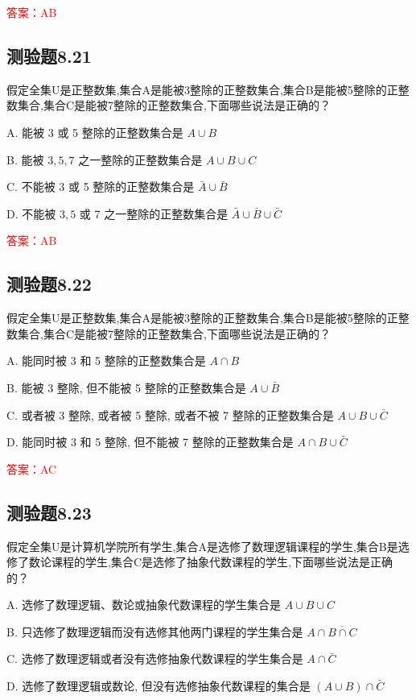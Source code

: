 \documentclass[UTF8, heading=true]{ctexart}
\begin{document}
\textcolor{red}{答案：AB}

\subsection{测验题8.21}

假定全集U是正整数集,集合A是能被3整除的正整数集合,集合B是能被5整除的正整数集合,集合C是能被7整除的正整数集合,下面哪些说法是正确的？

A. 能被 3 或 5 整除的正整数集合是 $A \cup B$

B. 能被 $3,5,7$ 之一整除的正整数集合是 $A \cup B \cup C$

C. 不能被 3 或 5 整除的正整数集合是 $\bar{A} \cup \bar{B}$

D. 不能被 $3,5$ 或 7 之一整除的正整数集合是 $\bar{A} \cup \bar{B} \cup \bar{C}$

\textcolor{red}{答案：AB}

\subsection{测验题8.22}

假定全集U是正整数集,集合A是能被3整除的正整数集合,集合B是能被5整除的正整数集合,集合C是能被7整除的正整数集合,下面哪些说法是正确的？

A. 能同时被 3 和 5 整除的正整数集合是 $A \cap B$

B. 能被 3 整除, 但不能被 5 整除的正整数集合是 $A \cup \bar{B}$

C. 或者被 3 整除, 或者被 5 整除, 或者不被 7 整除的正整数集合是 $A \cup B \cup \bar{C}$

D. 能同时被 3 和 5 整除, 但不能被 7 整除的正整数集合是 $A \cap B \cup \bar{C}$

\textcolor{red}{答案：AC}
\subsection{测验题8.23}

假定全集U是计算机学院所有学生,集合A是选修了数理逻辑课程的学生,集合B是选修了数论课程的学生,集合C是选修了抽象代数课程的学生,下面哪些说法是正确的？

A. 选修了数理逻辑、数论或抽象代数课程的学生集合是 $A \cup B \cup C$

B. 只选修了数理逻辑而没有选修其他两门课程的学生集合是 $A \cap \overline{B \cap C}$

C. 选修了数理逻辑或者没有选修抽象代数课程的学生集合是 $A \cap \bar{C}$

D. 选修了数理逻辑或数论, 但没有选修抽象代数课程的集合是 $(A \cup B) \cap \bar{C}$
\end{document}
